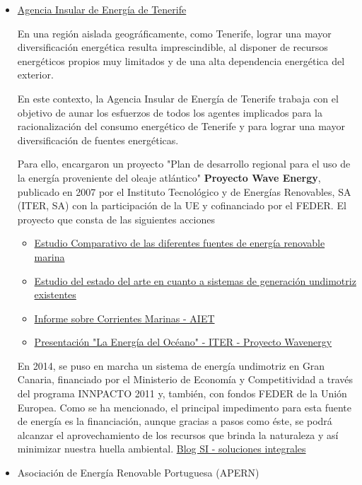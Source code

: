 \begin{itemize}
\item
  \href{http://www.agenergia.org/index.php?section=20}{Agencia Insular
  de Energía de Tenerife}

  En una región aislada geográficamente, como Tenerife, lograr una mayor
  diversificación energética resulta imprescindible, al disponer de
  recursos energéticos propios muy limitados y de una alta dependencia
  energética del exterior.

  En este contexto, la Agencia Insular de Energía de Tenerife trabaja
  con el objetivo de aunar los esfuerzos de todos los agentes implicados
  para la racionalización del consumo energético de Tenerife y para
  lograr una mayor diversificación de fuentes energéticas.

  Para ello, encargaron un proyecto "Plan de desarrollo regional para el
  uso de la energía proveniente del oleaje atlántico" \textbf{Proyecto
  Wave Energy}, publicado en 2007 por el Instituto Tecnológico y de
  Energías Renovables, SA (ITER, SA) con la participación de la UE y
  cofinanciado por el FEDER. El proyecto que consta de las siguientes
  acciones

  \begin{itemize}
  \item
    \href{http://www.agenergia.org/index.php?action=view\&id=53\&module=resourcesmodule\&src=\%40random49140d138ac53}{Estudio
    Comparativo de las diferentes fuentes de energía renovable marina}
  \item
    \href{http://www.agenergia.org/index.php?action=view\&id=54\&module=resourcesmodule\&src=\%40random49140d138ac53}{Estudio
    del estado del arte en cuanto a sistemas de generación undimotriz
    existentes}
  \item
    \href{http://www.agenergia.org/index.php?action=view\&id=276\&module=resourcesmodule\&src=\%40random49140d138ac53}{Informe
    sobre Corrientes Marinas - AIET}
  \item
    \href{http://www.agenergia.org/index.php?action=view\&id=56\&module=resourcesmodule\&src=\%40random49140d138ac53}{Presentación
    "La Energía del Océano" - ITER - Proyecto Wavenergy}
  \end{itemize}

  En 2014, se puso en marcha un sistema de energía undimotriz en Gran
  Canaria, financiado por el Ministerio de Economía y Competitividad a
  través del programa INNPACTO 2011 y, también, con fondos FEDER de la
  Unión Europea. Como se ha mencionado, el principal impedimento para
  esta fuente de energía es la financiación, aunque gracias a pasos como
  éste, se podrá alcanzar el aprovechamiento de los recursos que brinda
  la naturaleza y así minimizar nuestra huella ambiental.
  \href{https://www.solucionesintegralesendesa.com/blog/equipamiento-hogar/ahorro-hogar/energia-undimotriz-el-poder-de-las-olas/}{Blog
  SI - soluciones integrales}
\item
  Asociación de Energía Renovable Portuguesa (APERN)


\end{itemize}
